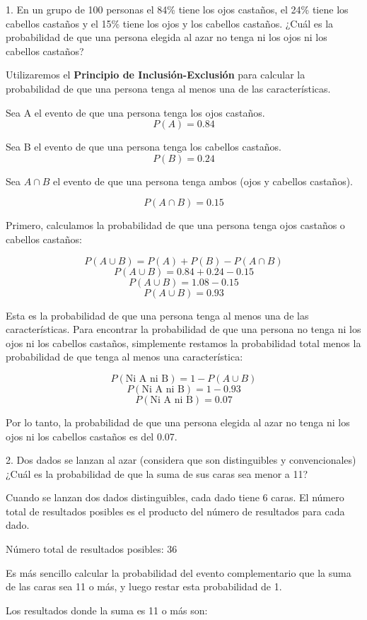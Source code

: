 1. En un grupo de 100 personas el 84\% tiene los ojos castaños, 
el 24\% tiene los cabellos castaños y el 15\% tiene los ojos y los cabellos castaños. 
¿Cuál es la probabilidad de que una persona elegida al azar no tenga ni los ojos ni 
los cabellos castaños?

Utilizaremos el \textbf{Principio de Inclusión-Exclusión} para calcular la probabilidad 
de que una persona tenga al menos una de las características.

Sea A el evento de que una persona tenga los ojos castaños.
$$P(A) = 0.84$$

Sea B el evento de que una persona tenga los cabellos castaños.
$$P(B) = 0.24$$

Sea $A\cap B$ el evento de que una persona tenga ambos 
(ojos y cabellos castaños).

$$P(A \cap B) = 0.15$$


Primero, calculamos la probabilidad de que una persona tenga ojos castaños o 
cabellos castaños:

$$P(A \cup B) = P(A) + P(B) - P(A \cap B)$$
$$P(A \cup B) = 0.84 + 0.24 - 0.15$$
$$P(A \cup B) = 1.08 - 0.15$$
$$P(A \cup B) = 0.93$$

Esta es la probabilidad de que una persona tenga al menos una de las características. 
Para encontrar la probabilidad de que una persona no tenga ni los ojos ni los 
cabellos castaños, simplemente restamos la probabilidad total menos la probabilidad 
de que tenga al menos una característica:

$$P(\text{Ni A ni B}) = 1 - P(A \cup B)$$
$$P(\text{Ni A ni B}) = 1 - 0.93$$
$$P(\text{Ni A ni B}) = 0.07$$

Por lo tanto, la probabilidad de que una persona elegida al azar no tenga ni los 
ojos ni los cabellos castaños es del 0.07.

\newpage

2. Dos dados se lanzan al azar (considera que son distinguibles y convencionales) 
¿Cuál es la probabilidad de que la suma de sus caras sea menor a 11?

Cuando se lanzan dos dados distinguibles, cada dado tiene 6 caras. 
El número total de resultados posibles es el producto del número de 
resultados para cada dado.

Número total de resultados posibles: 36

Es más sencillo calcular la probabilidad del evento complementario que la suma de las 
caras sea 11 o más, y luego restar esta probabilidad de 1.

Los resultados donde la suma es 11 o más son:

